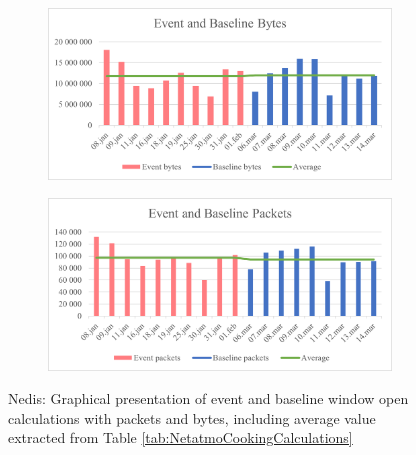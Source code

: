 \begin{figure}[H]
    \centering
    \begin{subfigure}{0.8\textwidth}
        \centering
        \includegraphics[width=1\hsize]{figures/Nedis_Window_Calculations_Bytes.png} 
    \end{subfigure}
    \begin{subfigure}{0.8\textwidth}
        \centering
        \includegraphics[width=1\hsize]{figures/Nedis_Window_Calculations_Packets.png} 
    \end{subfigure}
    \caption{Nedis: Graphical presentation of event and baseline window open calculations with packets and bytes, including average value extracted from Table \ref{tab:NetatmoCookingCalculations}}
    \label{fig:NedisWindowCalculations}
\end{figure}

